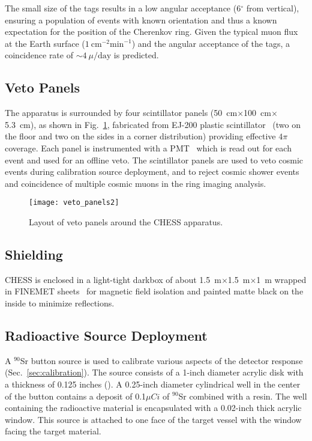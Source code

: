 The small size of the tags results in a low angular acceptance (6$^{\circ}$ from vertical), ensuring a population of events with known orientation and thus a known expectation for the position of the Cherenkov ring.  
Given the typical muon flux at the Earth surface ($1~\mbox{cm}^{-2}\mbox{min}^{-1}$) and the angular acceptance of the tags, a coincidence rate of $\sim4~\mu / \mbox{day}$ is predicted. 

\subsection{Veto Panels}\label{s:veto}

The apparatus is surrounded by four scintillator panels (50~cm$\times$100~cm$\times$5.3~cm), as shown in Fig.~\ref{f:veto}, fabricated from EJ-200 plastic scintillator~\cite{ej200} (two on the floor and two on the sides in a corner distribution) providing effective $4\pi$ coverage. 
Each panel is instrumented with a PMT~\cite{9102ksb} which is read out for each event and used for an offline veto. The scintillator panels are used to veto cosmic events during calibration source deployment, and to reject cosmic shower events and coincidence of multiple cosmic muons in the ring imaging analysis. 

\begin{figure}
\centering
\texttt{[image: veto\_panels2]}
\caption{Layout of veto panels around the CHESS apparatus. }
\label{f:veto}
\end{figure}


\subsection{Shielding}
CHESS is enclosed in a light-tight darkbox of about 1.5~m$\times$1.5~m$\times$1~m wrapped in FINEMET\textsuperscript{\textregistered} sheets~\cite{finemet} for magnetic field isolation and painted matte black on the inside to minimize reflections.  


\subsection{Radioactive Source Deployment}\label{s:source}
A $^{90}$Sr button source is used to calibrate various aspects of the detector response (Sec.~\ref{sec:calibration}).  The source consists of a 1-inch diameter acrylic disk with a thickness of 0.125 inches (\cite{buttonsource}). A 0.25-inch diameter cylindrical well in the center of the button contains a deposit of 0.1$\mu Ci$ of $^{90}$Sr combined with a resin. The well containing the radioactive material is encapsulated with a 0.02-inch thick acrylic window. This source is attached to one face of the target vessel with the window facing the target material.

